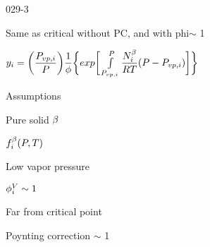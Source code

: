 \begin{mitframe}{029-3}

        \begin{listone}
        
        \item Same as critical without PC, and with phi$\sim$ 1
  
		\item $y_{i}=\bigg(\dfrac{\p_{vp,\state}}{\p}\bigg)\dfrac{1}{\eleccoeff}\bigg\{exp\bigg[\int\limits_{\p_{vp,\state}}^{\p}\dfrac{\nummoles_{\state}^{\texpcoeff}}{\gasconst\Temp}(\p-\p_{vp,\state})\bigg]\bigg\}$
	
		\item Assumptions
 
			\begin{listtwo}
                    \item Pure solid $\texpcoeff$ 
                         
             		\begin{listthree}
                    		\item$\fug_{\state}^{\texpcoeff}(\p,\Temp)$
                    \end{listthree}
               
               \item Low vapor pressure
      
                    \begin{listthree}
                    
                    		\item $\eleccoeff_{\state}^{\vol}\sim{1}$
                  	
                    \end{listthree}

              \item Far from critical point
                               
                   \begin{listthree}
                    
                    	\item Poynting correction $\sim$ 1
                   
                   \end{listthree}
  			
            \end{listtwo}
  
  \end{listone}

\end{mitframe}